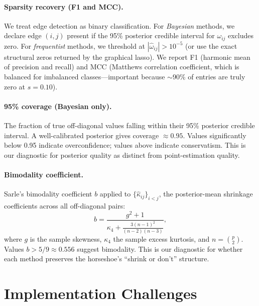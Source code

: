 \documentclass[10pt,conference,compsoc]{IEEEtran}
\begin{document}
\paragraph{Sparsity recovery (F1 and MCC).} We treat edge detection as binary classification. For \emph{Bayesian} methods, we declare edge $(i,j)$ present if the 95\% posterior credible interval for $\omega_{ij}$ excludes zero. For \emph{frequentist} methods, we threshold at $|\hat\omega_{ij}| > 10^{-5}$ (or use the exact structural zeros returned by the graphical lasso). We report F1 (harmonic mean of precision and recall) and MCC (Matthews correlation coefficient, which is balanced for imbalanced classes---important because $\sim$90\% of entries are truly zero at $s = 0.10$).

\paragraph{95\% coverage (Bayesian only).} The fraction of true off-diagonal values falling within their 95\% posterior credible interval. A well-calibrated posterior gives coverage $\approx 0.95$. Values significantly below 0.95 indicate overconfidence; values above indicate conservatism. This is our diagnostic for posterior quality as distinct from point-estimation quality.

\paragraph{Bimodality coefficient.} Sarle's bimodality coefficient $b$ applied to $\{\hat\kappa_{ij}\}_{i<j}$, the posterior-mean shrinkage coefficients across all off-diagonal pairs:
\begin{equation}
  b = \frac{g^2 + 1}{\kappa_4 + \frac{3(n-1)^2}{(n-2)(n-3)}},
  \label{eq:bimodality}
\end{equation}
where $g$ is the sample skewness, $\kappa_4$ the sample excess kurtosis, and $n = \binom{p}{2}$. Values $b > 5/9 \approx 0.556$ suggest bimodality. This is our diagnostic for whether each method preserves the horseshoe's ``shrink or don't'' structure.

\section{Implementation Challenges}
\label{sec:engineering}
\end{document}

